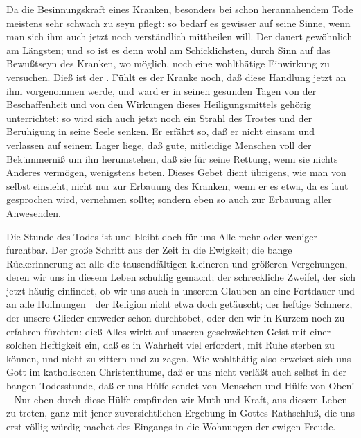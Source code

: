 \begin{aufza}
\item Da die Besinnungskraft eines Kranken, besonders bei schon herannahendem Tode meistens sehr schwach zu seyn pflegt: so bedarf es gewisser  auf seine Sinne, wenn man sich ihm auch jetzt noch verständlich mittheilen will. Der  dauert gewöhnlich am Längsten; und so ist es denn wohl am Schicklichsten, durch  Sinn auf das Bewußtseyn des Kranken, wo möglich, noch eine wohlthätige Einwirkung zu versuchen. Dieß ist der .
Fühlt es der Kranke noch, daß diese Handlung jetzt an ihm vorgenommen werde, und ward er in seinen gesunden Tagen von der Beschaffenheit und von den Wirkungen dieses Heiligungsmittels gehörig unterrichtet: so wird sich auch jetzt noch ein Strahl des Trostes und der Beruhigung in seine Seele senken. Er erfährt so, daß er nicht einsam und verlassen auf seinem Lager liege, daß gute, mitleidige Menschen voll der Bekümmerniß um ihn herumstehen, daß sie für seine Rettung, wenn sie nichts Anderes vermögen, wenigstens beten. Dieses Gebet dient übrigens, wie man von selbst einsieht, nicht nur zur Erbauung des Kranken, wenn er es etwa, da es laut gesprochen wird, vernehmen sollte; sondern eben so auch zur Erbauung aller Anwesenden.
\item Die Stunde des Todes ist und bleibt doch für uns Alle mehr oder weniger furchtbar. Der große Schritt aus der Zeit in die Ewigkeit; die bange Rückerinnerung an alle die tausendfältigen kleineren und größeren Vergehungen, deren wir uns in diesem Leben schuldig gemacht; der schreckliche Zweifel, der sich jetzt häufig einfindet, ob wir uns auch in unserem Glauben an eine Fortdauer und an alle Hoffnungen~\ der Religion nicht etwa doch getäuscht; der heftige Schmerz, der unsere Glieder entweder schon durchtobet, oder den wir in Kurzem noch zu erfahren fürchten: dieß Alles wirkt auf unseren geschwächten Geist mit einer solchen Heftigkeit ein, daß es in Wahrheit viel erfordert, mit Ruhe sterben zu können, und nicht zu zittern und zu zagen. Wie wohlthätig also erweiset sich uns Gott im katholischen Christenthume, daß er uns nicht verläßt auch selbst in der bangen Todesstunde, daß er uns Hülfe sendet von Menschen und Hülfe von Oben! -- Nur eben durch diese Hülfe empfinden wir Muth und Kraft, aus diesem Leben zu treten, ganz mit jener zuversichtlichen Ergebung in Gottes Rathschluß, die uns erst völlig würdig machet des Eingangs in die Wohnungen der ewigen Freude. 
\end{aufza}

